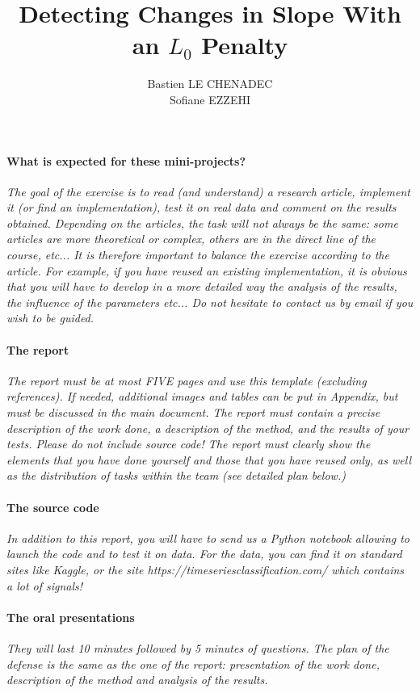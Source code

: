 \documentclass[11pt]{article}
\title{Detecting Changes in Slope With an $L_0$ Penalty}
\author{
Bastien LE CHENADEC \email{bastien.le-chenadec@eleves.enpc.fr} \\ %
Sofiane EZZEHI \email{sofiane.ezzehi@eleves.enpc.fr} %
}
\begin{document}
\maketitle
\paragraph{What is expected for these mini-projects?}
\textit{
    The goal of the exercise is to read (and understand) a research article, implement it (or find an implementation), test it on real data and comment on the results obtained.
    Depending on the articles, the task will not always be the same: some articles are more theoretical or complex, others are in the direct line of the course, etc... It is therefore important to balance the exercise according to the article. For example, if you have reused an existing implementation, it is obvious that you will have to develop in a more detailed way the analysis of the results, the influence of the parameters etc... Do not hesitate to contact us by email if you wish to be guided.}

\paragraph{The report}
\textit{
    The report must be at most FIVE pages and use this template (excluding references). If needed, additional images and tables can be put in Appendix, but must be discussed in the main document. The report must contain a precise description of the work done, a description of the method, and the results of your tests. Please do not include source code! The report must clearly show the elements that you have done yourself and those that you have reused only, as well as the distribution of tasks within the team (see detailed plan below.)}

\paragraph{The source code}
\textit{
    In addition to this report, you will have to send us a Python notebook allowing to launch the code and to test it on data. For the data, you can find it on standard sites like Kaggle, or the site https://timeseriesclassification.com/ which contains a lot of signals!}


\paragraph{The oral presentations}
\textit{
    They will last 10 minutes followed by 5 minutes of questions. The plan of the defense is the same as the one of the report: presentation of the work done, description of the method and analysis of the results.}
\end{document}
